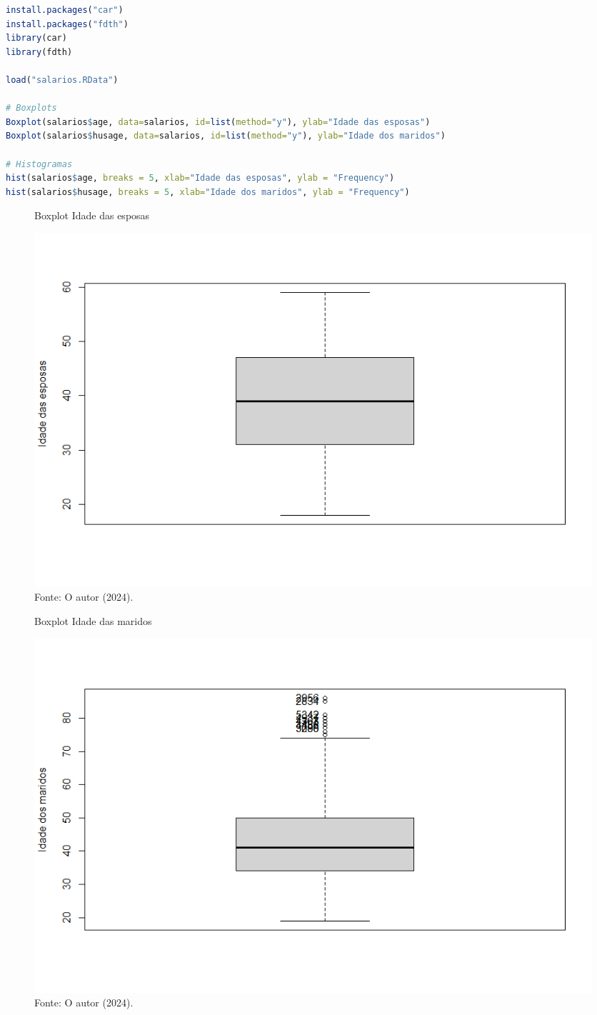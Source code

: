 \begin{lstlisting}[language=R, style=input]
install.packages("car")
install.packages("fdth")
library(car)
library(fdth)

load("salarios.RData")

# Boxplots
Boxplot(salarios$age, data=salarios, id=list(method="y"), ylab="Idade das esposas")
Boxplot(salarios$husage, data=salarios, id=list(method="y"), ylab="Idade dos maridos")

# Histogramas
hist(salarios$age, breaks = 5, xlab="Idade das esposas", ylab = "Frequency")
hist(salarios$husage, breaks = 5, xlab="Idade dos maridos", ylab = "Frequency")
\end{lstlisting}
\begin{figure}[H]
\centering
\caption{Boxplot Idade das esposas}
\includegraphics[width=1\linewidth]{apendices/fig/4_IAA004_1.png}
\caption*{Fonte: O autor (2024).}
\end{figure}
\begin{figure}[H]
\centering
\caption{Boxplot Idade das maridos}
\includegraphics[width=1\linewidth]{apendices/fig/4_IAA004_2.png}
\caption*{Fonte: O autor (2024).}
\end{figure}

